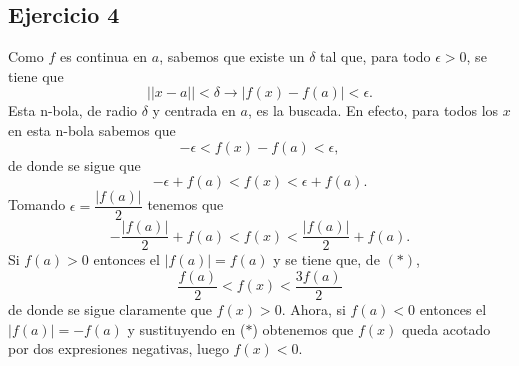 \subsection*{Ejercicio 4}
\begin{sol}
	Como $f$ es continua en $a$, sabemos que existe un $\delta$ tal que, para todo $\epsilon > 0$, se tiene que 
	$$ ||x-a|| < \delta \rightarrow |f(x) - f(a)| < \epsilon.$$
	Esta n-bola, de radio $\delta$ y centrada en $a$, es la buscada. En efecto, para todos los $x$ en esta n-bola sabemos que
	$$ -\epsilon < f(x) - f(a) < \epsilon,$$
	de donde se sigue que
	$$ -\epsilon + f(a) < f(x) < \epsilon + f(a).$$ 
	Tomando $\epsilon = \dfrac{|f(a)|}{2}$ tenemos que   	
	\[ -\frac{|f(a)|}{2} + f(a) < f(x) < \frac{|f(a)|}{2} + f(a). \tag{$\ast$} \]
	Si $f(a) > 0$ entonces el $|f(a)| = f(a)$ y se tiene que, de $(\ast)$,
	$$ \frac{f(a)}{2} < f(x) < \frac{3f(a)}{2} $$
	de donde se sigue claramente que $f(x) > 0$. Ahora, si $f(a)<0$ entonces el $|f(a)| = -f(a)$ y sustituyendo en ($\ast$) obtenemos que $f(x)$ queda acotado por dos expresiones negativas, luego $f(x) <0$. 
\end{sol}

